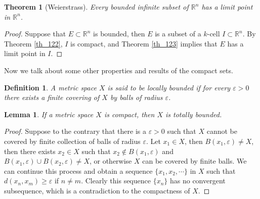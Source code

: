 \documentclass[10pt]{book}
\newtheorem{definition}{Definition}[chapter]
\newtheorem{theorem}{Theorem}[chapter]
\newtheorem{lemma}{Lemma}[chapter]
\theoremstyle{definition}
\numberwithin{equation}{chapter}
\begin{document}
\medskip

\begin{theorem}[Weierstrass]\label{}
Every bounded infinite subset of $\mathbb{R}^n$ has a limit point in $\mathbb{R}^n$.
\end{theorem}
\begin{proof}
Suppose that $E \subset \mathbb{R}^n$ is bounded, then $E$ is a subset of a $k$-cell $I \subset \mathbb{R}^n$. By Theorem \ref{th_122}, $I$ is compact, and Theorem \ref{th_123} implies that $E$ has a limit point in $I$.
\end{proof}

\medskip

Now we talk about some other properties and results of the compact sets.

\medskip

\begin{definition}
A metric space $X$ is said to be locally bounded if for every $\varepsilon > 0$ there exists a finite covering of $X$ by balls of radius $\varepsilon$.
\end{definition}

\medskip

\begin{lemma}
If a metric space $X$ is compact, then $X$ is totally bounded.
\end{lemma}
\begin{proof}
Suppose to the contrary that there is a $\varepsilon > 0$ such that $X$ cannot be covered by finite collection of balls of radius $\varepsilon$. Let $x_1 \in X$, then $B(x_1,\varepsilon) \neq X$, then there exists $x_2 \in X$ such that $x_2 \notin B(x_1,\varepsilon)$ and $B(x_1,\varepsilon) \cup B(x_2,\varepsilon) \neq X$, or otherwise $X$ can be covered by finite balls. We can continue this process and obtain a sequence $\{x_1, x_2, \cdots\}$ in $X$ such that $d(x_n,x_m) \geq \varepsilon$ if $n \neq m$. Clearly this sequence $\{x_n\}$ has no convergent subsequence, which is a contradiction to the compactness of $X$.
\end{proof}

\medskip
\end{document}
